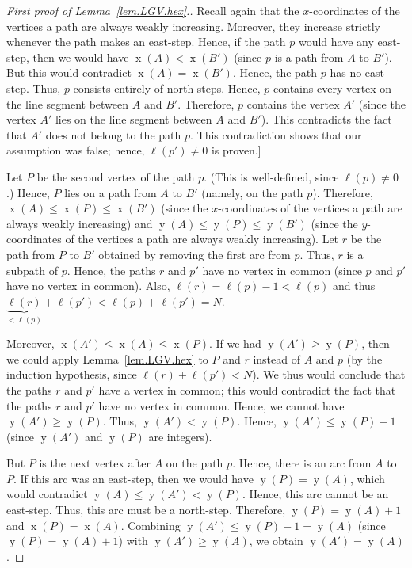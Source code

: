 \documentclass[reqno]{amsart}
\newcommand{\0}{\phantom{c}}
\DeclareMathOperator{\xcoord}{x} %
\DeclareMathOperator{\ycoord}{y} %
\newenvironment{verlonglong}{}{}
\theoremstyle{plain}
\theoremstyle{definition}
\numberwithin{equation}{section}
\begin{document}
\begin{verlonglong}
\begin{proof}[First proof of Lemma~\ref{lem.LGV.hex}.]
Recall again that the $x$-coordinates of the vertices a path are always weakly increasing.
Moreover, they increase strictly whenever the path makes an east-step.
Hence, if the path $p$ would have any east-step, then we would have $\xcoord(A) < \xcoord(B')$ (since $p$ is a path from $A$ to $B'$).
But this would contradict $\xcoord(A) = \xcoord(B')$.
Hence, the path $p$ has no east-step.
Thus, $p$ consists entirely of north-steps.
Hence, $p$ contains every vertex on the line segment between $A$ and $B'$.
Therefore, $p$ contains the vertex $A'$ (since the vertex $A'$ lies on the line segment between $A$ and $B'$).
This contradicts the fact that $A'$ does not belong to the path $p$.
This contradiction shows that our assumption was false; hence, $\ell(p') \neq 0$ is proven.]

Let $P$ be the second vertex of the path $p$.
(This is well-defined, since $\ell(p) \neq 0$.)
Hence, $P$ lies on a path from $A$ to $B'$ (namely, on the path $p$).
Therefore, $\xcoord(A) \leq \xcoord(P) \leq \xcoord(B')$ (since the $x$-coordinates of the vertices a path are
always weakly increasing) and $\ycoord(A) \leq \ycoord(P) \leq \ycoord(B')$ (since the $y$-coordinates of the vertices a path are always weakly increasing).
Let $r$ be the path from $P$ to $B'$ obtained by removing the first arc from $p$.
Thus, $r$ is a subpath of $p$.
Hence, the paths $r$ and $p'$ have no vertex in common (since $p$ and $p'$ have no vertex in common).
Also, $\ell(r) = \ell(p) - 1 < \ell(p)$ and thus $\underbrace{\ell(r)}_{<\ell(p)} + \ell(p') < \ell(p) + \ell(p') = N$.

Moreover, $\xcoord(A') \leq \xcoord(A) \leq \xcoord(P)$.
If we had $\ycoord(A') \geq \ycoord(P)$, then we could apply Lemma~\ref{lem.LGV.hex} to $P$ and $r$ instead of $A$ and $p$ (by the induction hypothesis, since $\ell(r) + \ell(p') < N$).
We thus would conclude that the paths $r$ and $p'$ have a vertex in common; this would contradict the fact that the paths $r$ and $p'$ have no vertex in common.
Hence, we cannot have $\ycoord(A') \geq \ycoord(P)$.
Thus, $\ycoord(A') < \ycoord(P)$.
Hence, $\ycoord(A') \leq \ycoord(P)  -1$ (since $\ycoord(A')$ and $\ycoord(P)$ are integers).

But $P$ is the next vertex after $A$ on the path $p$.
Hence, there is an arc from $A$ to $P$. If this arc was an east-step, then we would have $\ycoord(P) = \ycoord(A)$, which would contradict $\ycoord(A) \leq \ycoord(A') < \ycoord(P)$.
Hence, this arc cannot be an east-step.
Thus, this arc must be a north-step.
Therefore, $\ycoord(P) = \ycoord(A) + 1$ and $\xcoord(P) = \xcoord(A)$.
Combining $\ycoord(A') \leq \ycoord(P) - 1 = \ycoord(A)$ (since $\ycoord(P) = \ycoord(A) + 1$) with $\ycoord(A') \geq \ycoord(A)$, we obtain $\ycoord(A') = \ycoord(A)$.


\end{proof}
\end{verlonglong}
\end{document}

